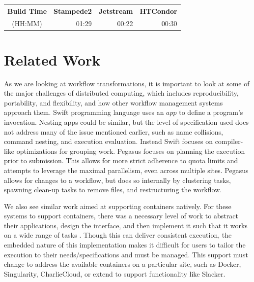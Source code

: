 \documentclass[conference]{IEEEtran}
\begin{document}
\begin{center}
\begin{tabular}{| c | r | r | r |}
\hline
Build Time
  & \multicolumn{1}{|c|}{Stampede2} 
  & \multicolumn{1}{|c|}{Jetstream} 
  & \multicolumn{1}{|c|}{HTCondor} \\ \hline
 (HH:MM) & 01:29 & 00:22 & 00:30 \\ \hline
\end{tabular}
\end{center}

\section{Related Work}

As we are looking at workflow 
transformations, it is important to look
at some of the major challenges of distributed
computing\cite{4404805},
which includes reproducibility, 
portability,
and flexibility, and 
how other workflow management systems
approach them.
Swift\cite{swift} programming language 
uses an $app$ to define a program's invocation.
Nesting apps could be similar, 
but the level of
specification used does
not address many of the
issue mentioned earlier, such
as name collisions, command
nesting, and execution evaluation.
Instead Swift focuses on compiler-like
optimizations for grouping work\cite{Armstrong:2014:CTM:2683593.2683627}.
Pegasus\cite{pegasus} focuses on planning the
execution prior to submission.
This allows for more strict
adherence to quota limits and attempts
to leverage the maximal parallelism,
even across multiple sites\cite{chen2011constraints}.
Pegasus allows for changes to a
workflow, but does so internally by clustering
tasks\cite{chen2013balanced, chen-tcc-2015, chen-fgcs-2014}, spawning clean-up
tasks to remove files\cite{cleanup_algo}, and 
restructuring the workflow\cite{cluster_dep}.

We also see similar work aimed at 
supporting containers natively.
For these systems to support containers,
there was a necessary level of work to abstract their applications,
design the interface, and then implement it
such that it works on a wide range of tasks
\cite{wq-docker-vtdc15, containers-sciencecloud-2018,7092947,7600178}.
Though this can deliver consistent execution,
the embedded nature of this implementation makes
it difficult for users to tailor the execution
to their needs/specifications and must be
managed.
This support must change to address
the available containers on a particular site,
such as 
Docker\cite{Merkel:2014:DLL:2600239.2600241},
Singularity\cite{Singularity}, 
CharlieCloud\cite{Priedhorsky:2017:CUC:3126908.3126925},
or extend to support functionality like Slacker\cite{194430}.
\end{document}
